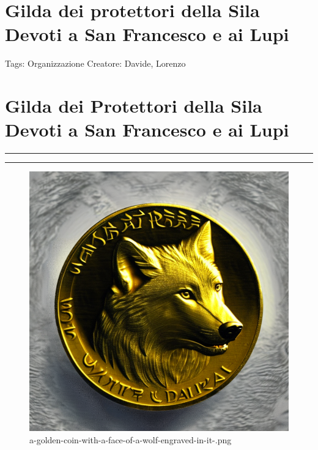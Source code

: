 \section{Gilda dei protettori della Sila Devoti a San Francesco e ai
Lupi}\label{gilda-dei-protettori-della-sila-devoti-a-san-francesco-e-ai-lupi}

Tags: Organizzazione Creatore: Davide, Lorenzo

\section{\texorpdfstring{\textbf{Gilda dei Protettori della Sila Devoti
a San Francesco e ai
Lupi}}{Gilda dei Protettori della Sila Devoti a San Francesco e ai Lupi}}\label{gilda-dei-protettori-della-sila-devoti-a-san-francesco-e-ai-lupi-1}

\begin{center}\rule{0.5\linewidth}{0.5pt}\end{center}

\begin{center}\rule{0.5\linewidth}{0.5pt}\end{center}

\begin{figure}
\centering
\includegraphics{a-golden-coin-with-a-face-of-a-wolf-engraved-in-it-.png}
\caption{a-golden-coin-with-a-face-of-a-wolf-engraved-in-it-.png}
\end{figure}

